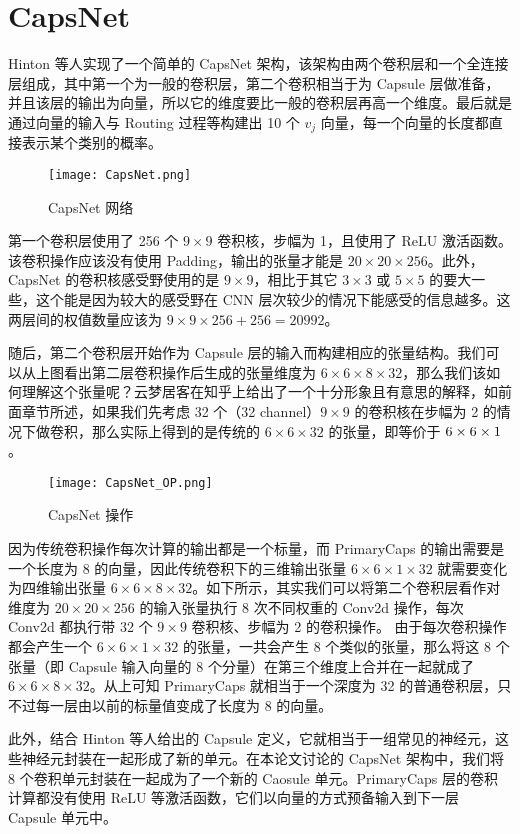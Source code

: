 \section{CapsNet}
Hinton 等人实现了一个简单的 CapsNet 架构，该架构由两个卷积层和一个全连接层组成，其中第一个为一般的卷积层，第二个卷积相当于为 Capsule 层做准备，并且该层的输出为向量，所以它的维度要比一般的卷积层再高一个维度。最后就是通过向量的输入与 Routing 过程等构建出 10 个 $v_j$ 向量，每一个向量的长度都直接表示某个类别的概率。
\begin{figure}[H]
	\centering
	\texttt{[image: CapsNet.png]}
	\caption{CapsNet 网络}
	\label{fig:2}
\end{figure}
第一个卷积层使用了 256 个 $9\times9$ 卷积核，步幅为 1，且使用了 ReLU 激活函数。该卷积操作应该没有使用 Padding，输出的张量才能是 $20\times20\times256$。此外，CapsNet 的卷积核感受野使用的是 $9\times9$，相比于其它 $3\times3$ 或 $5\times5$ 的要大一些，这个能是因为较大的感受野在 CNN 层次较少的情况下能感受的信息越多。这两层间的权值数量应该为 $9\times9\times256+256=20992$。

随后，第二个卷积层开始作为 Capsule 层的输入而构建相应的张量结构。我们可以从上图看出第二层卷积操作后生成的张量维度为 $6\times6\times8\times32$，那么我们该如何理解这个张量呢？云梦居客在知乎上给出了一个十分形象且有意思的解释，如前面章节所述，如果我们先考虑 32 个（32 channel）$9\times9$ 的卷积核在步幅为 2 的情况下做卷积，那么实际上得到的是传统的 $6\times6\times32$ 的张量，即等价于 $6\times6\times1\time32$。
\begin{figure}[H]
	\centering
	\texttt{[image: CapsNet\_OP.png]}
	\caption{CapsNet 操作}
	\label{fig:3}
\end{figure}


因为传统卷积操作每次计算的输出都是一个标量，而 PrimaryCaps 的输出需要是一个长度为 8 的向量，因此传统卷积下的三维输出张量 $6\times6\times1\times32$ 就需要变化为四维输出张量 $6\times6\times8\times32$。如下所示，其实我们可以将第二个卷积层看作对维度为 $20\times20\times256$ 的输入张量执行 8 次不同权重的 Conv2d 操作，每次 Conv2d 都执行带 32 个 $9\times9$ 卷积核、步幅为 2 的卷积操作。
由于每次卷积操作都会产生一个 $6\times6\times1\times32$ 的张量，一共会产生 8 个类似的张量，那么将这 8 个张量（即 Capsule 输入向量的 8 个分量）在第三个维度上合并在一起就成了 $6\times6\times8\times32$。从上可知 PrimaryCaps 就相当于一个深度为 32 的普通卷积层，只不过每一层由以前的标量值变成了长度为 8 的向量。

此外，结合 Hinton 等人给出的 Capsule 定义，它就相当于一组常见的神经元，这些神经元封装在一起形成了新的单元。在本论文讨论的 CapsNet 架构中，我们将 8 个卷积单元封装在一起成为了一个新的 Caosule 单元。PrimaryCaps 层的卷积计算都没有使用 ReLU 等激活函数，它们以向量的方式预备输入到下一层 Capsule 单元中。

